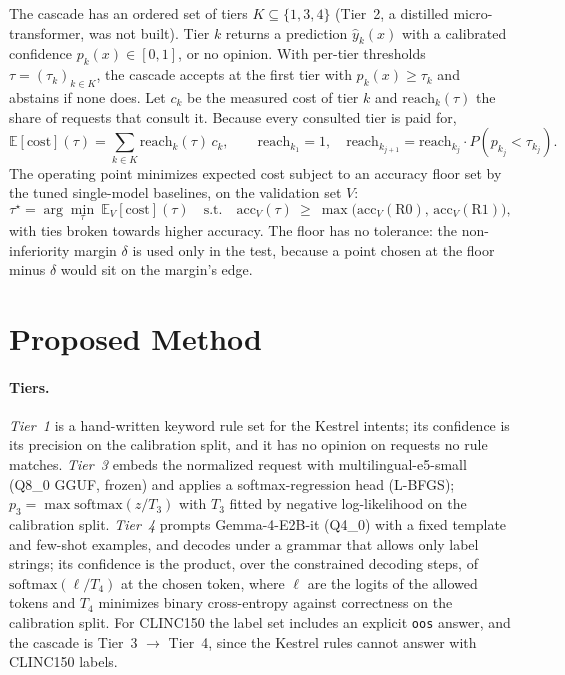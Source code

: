 \documentclass[11pt,a4paper]{article}
\begin{document}
The cascade has an ordered set of tiers $K\subseteq\{1,3,4\}$ (Tier~2, a distilled micro-transformer, was not built).
Tier $k$ returns a prediction $\hat y_k(x)$ with a calibrated confidence $p_k(x)\in[0,1]$, or no opinion. With
per-tier thresholds $\tau=(\tau_k)_{k\in K}$, the cascade accepts at the first tier with $p_k(x)\ge\tau_k$ and abstains
if none does. Let $c_k$ be the measured cost of tier $k$ and $\mathrm{reach}_k(\tau)$ the share of requests that consult
it. Because every consulted tier is paid for,
\begin{equation}
  \mathbb{E}[\mathrm{cost}](\tau)=\sum_{k\in K}\mathrm{reach}_k(\tau)\,c_k,\qquad
  \mathrm{reach}_{k_1}=1,\quad \mathrm{reach}_{k_{j+1}}=\mathrm{reach}_{k_j}\cdot P(p_{k_j}<\tau_{k_j}).
\end{equation}
The operating point minimizes expected cost subject to an accuracy floor set by the tuned single-model baselines,
on the validation set $V$:
\begin{equation}\label{eq:op}
  \tau^\star=\arg\min_{\tau}\ \mathbb{E}_V[\mathrm{cost}](\tau)\quad\text{s.t.}\quad
  \mathrm{acc}_V(\tau)\ \ge\ \max\bigl(\mathrm{acc}_V(\text{R0}),\,\mathrm{acc}_V(\text{R1})\bigr),
\end{equation}
with ties broken towards higher accuracy. The floor has no tolerance: the non-inferiority margin $\delta$ is used only
in the test, because a point chosen at the floor minus $\delta$ would sit on the margin's edge.

\section{Proposed Method}\label{sec:method}

\paragraph{Tiers.} \emph{Tier~1} is a hand-written keyword rule set for the Kestrel intents; its confidence is its
precision on the calibration split, and it has no opinion on requests no rule matches. \emph{Tier~3} embeds the
normalized request with multilingual-e5-small~\citep{wang2024me5} (Q8\_0 GGUF, frozen) and applies a softmax-regression
head (L-BFGS); $p_3=\max\mathrm{softmax}(z/T_3)$ with $T_3$ fitted by negative log-likelihood on the calibration split.
\emph{Tier~4} prompts Gemma-4-E2B-it (Q4\_0) with a fixed template and few-shot examples, and decodes under a grammar
that allows only label strings; its confidence is the product, over the constrained decoding steps, of
$\mathrm{softmax}(\ell/T_4)$ at the chosen token, where $\ell$ are the logits of the allowed tokens and $T_4$ minimizes
binary cross-entropy against correctness on the calibration split. For CLINC150 the label set includes an explicit
\texttt{oos} answer, and the cascade is Tier~3 $\to$ Tier~4, since the Kestrel rules cannot answer with CLINC150 labels.
\end{document}
